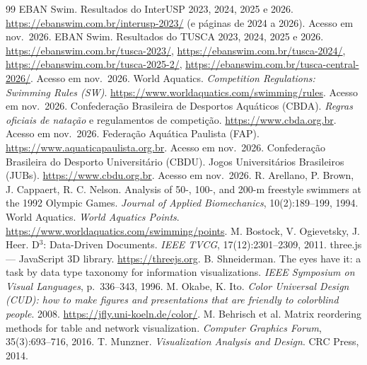 \documentclass[11pt,a4paper]{article}
\begin{document}
\begin{thebibliography}{99}\small
{} EBAN Swim. Resultados do InterUSP 2023, 2024, 2025 e 2026.
\url{https://ebanswim.com.br/interusp-2023/} (e páginas de 2024 a 2026). Acesso em nov.~2026.
 EBAN Swim. Resultados do TUSCA 2023, 2024, 2025 e 2026.
\url{https://ebanswim.com.br/tusca-2023/}, \url{https://ebanswim.com.br/tusca-2024/},
\url{https://ebanswim.com.br/tusca-2025-2/}, \url{https://ebanswim.com.br/tusca-central-2026/}. Acesso em nov.~2026.
 World Aquatics. \emph{Competition Regulations: Swimming Rules (SW)}. \url{https://www.worldaquatics.com/swimming/rules}. Acesso em nov.~2026.
 Confederação Brasileira de Desportos Aquáticos (CBDA). \emph{Regras oficiais de natação} e regulamentos de competição. \url{https://www.cbda.org.br}. Acesso em nov.~2026.
 Federação Aquática Paulista (FAP). \url{https://www.aquaticapaulista.org.br}. Acesso em nov.~2026.
 Confederação Brasileira do Desporto Universitário (CBDU). Jogos Universitários Brasileiros (JUBs). \url{https://www.cbdu.org.br}. Acesso em nov.~2026.
 R. Arellano, P. Brown, J. Cappaert, R. C. Nelson. Analysis of 50-, 100-, and 200-m freestyle swimmers at the 1992 Olympic Games. \emph{Journal of Applied Biomechanics}, 10(2):189--199, 1994.
 World Aquatics. \emph{World Aquatics Points}. \url{https://www.worldaquatics.com/swimming/points}.
 M. Bostock, V. Ogievetsky, J. Heer. D$^3$: Data-Driven Documents. \emph{IEEE TVCG}, 17(12):2301--2309, 2011.
 three.js --- JavaScript 3D library. \url{https://threejs.org}.
 B. Shneiderman. The eyes have it: a task by data type taxonomy for information
visualizations. \emph{IEEE Symposium on Visual Languages}, p.~336--343, 1996.
 M. Okabe, K. Ito. \emph{Color Universal Design (CUD): how to make figures and presentations that
are friendly to colorblind people}. 2008. \url{https://jfly.uni-koeln.de/color/}.
 M. Behrisch et al. Matrix reordering methods for table and network visualization.
\emph{Computer Graphics Forum}, 35(3):693--716, 2016.
 T. Munzner. \emph{Visualization Analysis and Design}. CRC Press, 2014.
\end{thebibliography}
\end{document}
